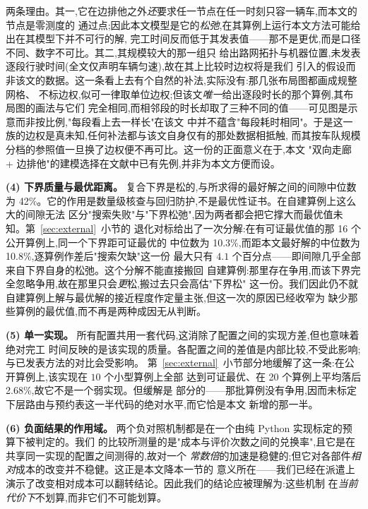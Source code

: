 \documentclass[manuscript,screen,review]{acmart}
\newcommand{\LBGapMed}{42\%}
\newcommand{\PubNInst}{20}
\newcommand{\PubNOpt}{16}                 %
\newcommand{\PubGapMean}{2.68\%}          %
\newcommand{\PubLBSlack}{10.3\%}          %
\newcommand{\PubLBTotal}{10.8\%}          %
\newcommand{\PubLBResidMax}{4.1}          %
\begin{document}
两条理由。其一,它在边排他之外\emph{还}要求任一节点在任一时刻只容一辆车,而本文的节点是零测度的
通过点;因此本文模型是它的\emph{松弛},在其算例上运行本文方法可能给出在其模型下并不可行的解,
完工时间反而低于其发表值——那不是更优,而是口径不同、数字不可比。其二,其规模较大的那一组只
给出路网拓扑与机器位置,未发表逐段行驶时间(全文仅声明车辆匀速),故在其上比较时边权将是我们
引入的假设而非该文的数据。这一条看上去有个自然的补法,实际没有:那几张布局图都画成规整网格、
不标边权,似可一律取单位边权;但该文\emph{唯一}给出逐段时长的那个算例,其布局图的画法与它们
完全相同,而相邻段的时长却取了三种不同的值——可见图是示意而非按比例,"每段看上去一样长"在该文
中并不蕴含"每段耗时相同"。于是这一族的边权是真未知,任何补法都与该文自身仅有的那处数据相抵触,
而其按车队规模分档的参照值一旦换了边权便不再可比。这一份的正面意义在于,本文
"双向走廊 + 边排他"的建模选择在文献中已有先例,并非为本文方便而设。

\textbf{(4) 下界质量与最优距离。} 复合下界是松的,与所求得的最好解之间的间隙中位数为
\LBGapMed{}。它的作用是数量级核查与回归防护,不是最优性证书。在自建算例上这么大的间隙无法
区分"搜索失败"与"下界松弛",因为两者都会把它撑大而最优值未知。第~\ref{sec:external}~小节的
退化对标给出了一次分解:在有可证最优值的那 \PubNOpt{} 个公开算例上,同一个下界距可证最优的
中位数为 \PubLBSlack{},而距本文最好解的中位数为 \PubLBTotal{},逐算例作差后"搜索欠缺"这一份
最大只有 $\PubLBResidMax$ 个百分点——即间隙几乎全部来自下界自身的松弛。这个分解不能直接搬回
自建算例:那里存在争用,而该下界完全忽略争用,故在那里只会\emph{更}松,搬过去只会高估"下界松"
这一份。我们因此仍不就自建算例上解与最优解的接近程度作定量主张,但这一次的原因已经收窄为
缺少那些算例的最优值,而不再是两种成因无从判断。

\textbf{(5) 单一实现。} 所有配置共用一套代码,这消除了配置之间的实现方差,但也意味着绝对完工
时间反映的是该实现的质量。各配置之间的差值是内部比较,不受此影响;与已发表方法的对比会受影响。
第~\ref{sec:external}~小节部分地缓解了这一条:在公开算例上,该实现在 $10$ 个小型算例上全部
达到可证最优、在 \PubNInst{} 个算例上平均落后 \PubGapMean{},故它不是一个弱实现。但缓解是
部分的——那批算例没有争用,因而未标定下层路由与预约表这一半代码的绝对水平,而它恰是本文
新增的那一半。

\textbf{(6) 负面结果的作用域。} 两个负对照机制都是在一个由纯 Python 实现标定的预算下被判定的。我们
的比较所测量的是"成本与评价次数之间的兑换率",且它是在共享同一实现的配置之间测得的,故对一个
\emph{常数倍}的加速是稳健的;但它对各部件\emph{相对}成本的改变并不稳健。这正是本文降本一节的
意义所在——我们已经在派遣上演示了改变相对成本可以翻转结论。因此我们的结论应被理解为:这些机制
在\emph{当前代价下}不划算,而非它们不可能划算。
\end{document}
